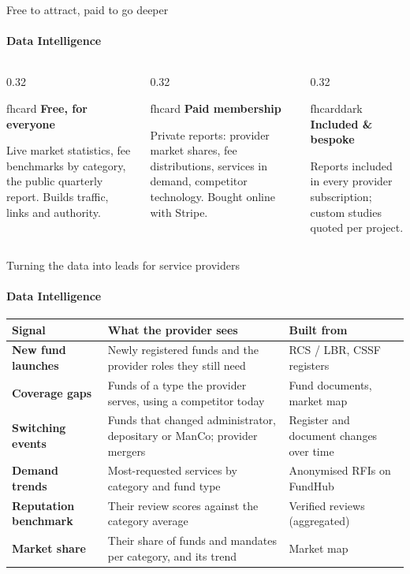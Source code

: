 \documentclass[aspectratio=169,10pt]{beamer}
\newcommand{\fhcard}[2]{%
  \begin{beamercolorbox}[wd=\linewidth,sep=7pt,rounded=true]{fhcard}
    {\small\bfseries\color{fhEmeraldDark}#1}\par\vspace{2pt}\footnotesize #2
  \end{beamercolorbox}}
\newcommand{\fhcarddark}[2]{%
  \begin{beamercolorbox}[wd=\linewidth,sep=7pt,rounded=true]{fhcarddark}
    {\small\bfseries\color{fhEmerald}#1}\par\vspace{2pt}\footnotesize #2
  \end{beamercolorbox}}
\begin{document}
\begin{frame}{Free to attract, paid to go deeper}
  \framesubtitle{Data Intelligence}
  \begin{columns}[T]
    \begin{column}{0.32\textwidth}
      \fhcard{Free, for everyone}{Live market statistics, fee benchmarks by category, the public quarterly report. Builds traffic, links and authority.}
    \end{column}
    \begin{column}{0.32\textwidth}
      \fhcard{Paid membership}{Private reports: provider market shares, fee distributions, services in demand, competitor technology. Bought online with Stripe.}
    \end{column}
    \begin{column}{0.32\textwidth}
      \fhcarddark{Included \& bespoke}{Reports included in every provider subscription; custom studies quoted per project.}
    \end{column}
  \end{columns}
\end{frame}

\begin{frame}{Turning the data into leads for service providers}
  \framesubtitle{Data Intelligence}
  \footnotesize
  \renewcommand{\arraystretch}{1.2}
  \begin{tabularx}{\textwidth}{@{}>{\bfseries}l X X@{}}
    \toprule
    Signal & What the provider sees & Built from \\
    \midrule
    New fund launches & Newly registered funds and the provider roles they still need & RCS / LBR, CSSF registers \\
    Coverage gaps & Funds of a type the provider serves, using a competitor today & Fund documents, market map \\
    Switching events & Funds that changed administrator, depositary or ManCo; provider mergers & Register and document changes over time \\
    Demand trends & Most-requested services by category and fund type & Anonymised RFIs on FundHub \\
    Reputation benchmark & Their review scores against the category average & Verified reviews (aggregated) \\
    Market share & Their share of funds and mandates per category, and its trend & Market map \\
    \bottomrule
  \end{tabularx}
\end{frame}
\end{document}
